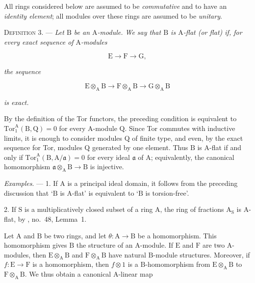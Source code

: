 
All rings considered below are assumed to be \emph{commutative} and to have an
\emph{identity element}; all modules over these rings are assumed to be
\emph{unitary}.


\textsc{Definition 3}. --- \emph{Let $\mathrm{B}$ be an
$\mathrm{A}$-module. We say that $\mathrm{B}$ is $\mathrm{A}$-flat (or flat) if, for every exact sequence
of $\mathrm{A}$-modules}

\begin{equation*}
\mathrm{E}\longrightarrow \mathrm{F}\longrightarrow \mathrm{G},
\end{equation*}

\emph{the sequence}

\begin{equation*}
\mathrm{E}\otimes_\mathrm{A}\mathrm{B}\longrightarrow \mathrm{F}\otimes_\mathrm{A}\mathrm{B}\longrightarrow \mathrm{G}\otimes_\mathrm{A}\mathrm{B}
\end{equation*}

\emph{is exact.}

By the definition of the Tor functors, the preceding condition is equivalent
to $\mathrm{Tor}_1^\mathrm{A}(\mathrm{B},\mathrm{Q})=0$ for every $\mathrm{A}$-module $\mathrm{Q}$. Since Tor commutes with
inductive limits, it is enough to consider modules $\mathrm{Q}$ of finite type, and
even, by the exact sequence for Tor, modules $\mathrm{Q}$ generated by one element.
Thus $\mathrm{B}$ is $\mathrm{A}$-flat if and only if
$\mathrm{Tor}_1^\mathrm{A}(\mathrm{B},\mathrm{A}/\mathfrak{a})=0$ for every ideal $\mathfrak{a}$ of $\mathrm{A}$;
equivalently, the canonical homomorphism
$\mathfrak{a}\otimes_\mathrm{A}\mathrm{B}\to \mathrm{B}$ is injective.

\emph{Examples}. --- 1. If $\mathrm{A}$ is a principal ideal domain, it follows from
the preceding discussion that `$\mathrm{B}$ is $\mathrm{A}$-flat' is equivalent to `$\mathrm{B}$ is
torsion-free'.

2. If $\mathrm{S}$ is a multiplicatively closed subset of a ring $\mathrm{A}$, the ring of
fractions $\mathrm{A}_\mathrm{S}$ is $\mathrm{A}$-flat, by , no.~48, Lemma~1.

Let $\mathrm{A}$ and $\mathrm{B}$ be two rings, and let $\theta:\mathrm{A}\to \mathrm{B}$ be a homomorphism. This
homomorphism gives $\mathrm{B}$ the structure of an $\mathrm{A}$-module. If $\mathrm{E}$ and $\mathrm{F}$ are two
$\mathrm{A}$-modules, then $\mathrm{E}\otimes_\mathrm{A}\mathrm{B}$ and $\mathrm{F}\otimes_\mathrm{A}\mathrm{B}$ have natural $\mathrm{B}$-module
structures. Moreover, if $f:\mathrm{E}\to \mathrm{F}$ is a homomorphism, then $f\otimes1$ is a
$\mathrm{B}$-homomorphism from $\mathrm{E}\otimes_\mathrm{A}\mathrm{B}$ to $\mathrm{F}\otimes_\mathrm{A}\mathrm{B}$. We thus obtain a
canonical $\mathrm{A}$-linear map

